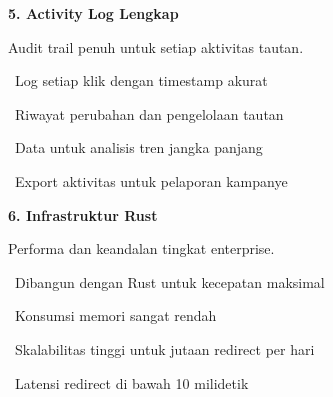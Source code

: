 \documentclass[a4paper]{article}
\begin{document}
\noindent
\begin{minipage}[t]{0.485\textwidth}
    \colorbox{OrangePrimary}{%
        \begin{minipage}{\dimexpr\textwidth-2\fboxsep\relax}
            {\fontsize{10}{13}\selectfont\bfseries\color{White} 5. Activity Log Lengkap}
        \end{minipage}}\par
    \vspace{4pt}
    {\fontsize{9}{12}\selectfont\color{TextDark}%
    Audit trail penuh untuk setiap aktivitas tautan.\par\vspace{3pt}
    \textbullet\ Log setiap klik dengan timestamp akurat\par\vspace{2pt}%
    \textbullet\ Riwayat perubahan dan pengelolaan tautan\par\vspace{2pt}%
    \textbullet\ Data untuk analisis tren jangka panjang\par\vspace{2pt}%
    \textbullet\ Export aktivitas untuk pelaporan kampanye}%
\end{minipage}%
\hfill
\begin{minipage}[t]{0.485\textwidth}
    \colorbox{CyanDark}{%
        \begin{minipage}{\dimexpr\textwidth-2\fboxsep\relax}
            {\fontsize{10}{13}\selectfont\bfseries\color{White} 6. Infrastruktur Rust}
        \end{minipage}}\par
    \vspace{4pt}
    {\fontsize{9}{12}\selectfont\color{TextDark}%
    Performa dan keandalan tingkat enterprise.\par\vspace{3pt}
    \textbullet\ Dibangun dengan Rust untuk kecepatan maksimal\par\vspace{2pt}%
    \textbullet\ Konsumsi memori sangat rendah\par\vspace{2pt}%
    \textbullet\ Skalabilitas tinggi untuk jutaan redirect per hari\par\vspace{2pt}%
    \textbullet\ Latensi redirect di bawah 10 milidetik}%
\end{minipage}

\vspace{8pt}
\end{document}
